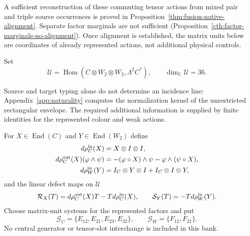 \documentclass[11pt]{article}
\numberwithin{equation}{section}
\theoremstyle{definition}
\theoremstyle{remark}
\newcommand{\C}{\mathbb C}
\newcommand{\End}{\operatorname{End}}
\newcommand{\Hom}{\operatorname{Hom}}
\begin{document}
A sufficient reconstruction of these commuting tensor actions from mixed
pair and triple source occurrences is proved in
Proposition~\ref{thm:fusion-native-alignment}.  Separate factor marginals are
not sufficient (Proposition~\ref{cth:factor-marginals-no-alignment}).  Once
alignment is established, the matrix units below are coordinates of already
represented actions, not additional physical controls.

Set
\begin{equation}
 \mathscr U=\Hom(C\otimes W_2\otimes W_2,\Lambda^2C^*),
 \qquad \dim_\C\mathscr U=36.
 \label{eq:naturality-port}
\end{equation}

Source and target typing alone do not determine an incidence line:
Appendix~\ref{app:naturality} computes the normalization kernel of the
unrestricted rectangular envelope.  The required additional information is
supplied by finite identities for the represented colour and weak actions.

For $X\in\End(C)$ and $Y\in\End(W_2)$ define
\begin{align}
 d\rho_C^{\rm in}(X)&=X\otimes I\otimes I,\nonumber\\
 d\rho_C^{\rm out}(X)(\varphi\wedge\psi)
   &=-(\varphi\circ X)\wedge\psi-\varphi\wedge(\psi\circ X),\nonumber\\
 d\rho_W^{\rm in}(Y)&=I_C\otimes Y\otimes I+I_C\otimes I\otimes Y,
 \label{eq:naturality-actions}
\end{align}
and the linear defect maps on $\mathscr U$
\begin{equation}
 \mathcal R_X(T)=d\rho_C^{\rm out}(X)T-Td\rho_C^{\rm in}(X),
 \qquad
 \mathcal S_Y(T)=-T d\rho_W^{\rm in}(Y).
 \label{eq:naturality-defects}
\end{equation}
Choose matrix-unit systems for the represented factors and put
\begin{equation}
 \mathcal G_C=\{E_{12},E_{21},E_{23},E_{32}\},\qquad
 \mathcal G_W=\{F_{12},F_{21}\}.
 \label{eq:six-naturality-generators}
\end{equation}
No central generator or tensor-slot interchange is included in this bank.
\end{document}
